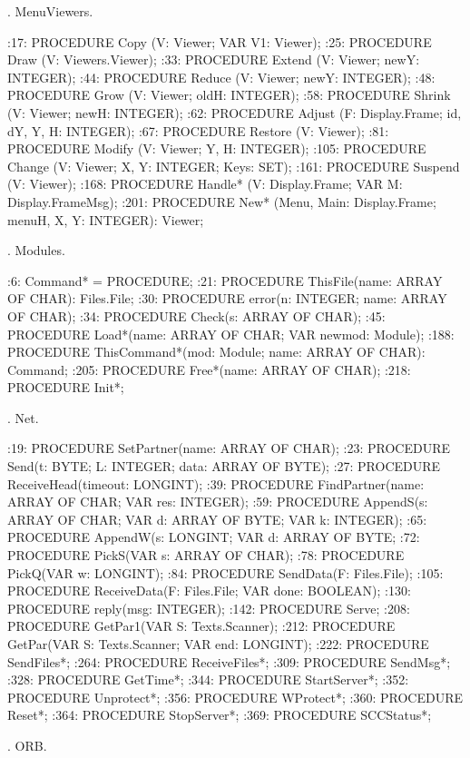 . MenuViewers.

:17:  PROCEDURE Copy (V: Viewer; VAR V1: Viewer);
:25:  PROCEDURE Draw (V: Viewers.Viewer);
:33:  PROCEDURE Extend (V: Viewer; newY: INTEGER);
:44:  PROCEDURE Reduce (V: Viewer; newY: INTEGER);
:48:  PROCEDURE Grow (V: Viewer; oldH: INTEGER);
:58:  PROCEDURE Shrink (V: Viewer; newH: INTEGER);
:62:  PROCEDURE Adjust (F: Display.Frame; id, dY, Y, H: INTEGER);
:67:  PROCEDURE Restore (V: Viewer);
:81:  PROCEDURE Modify (V: Viewer; Y, H: INTEGER);
:105:  PROCEDURE Change (V: Viewer; X, Y: INTEGER; Keys: SET);
:161:  PROCEDURE Suspend (V: Viewer);
:168:  PROCEDURE Handle* (V: Display.Frame; VAR M: Display.FrameMsg);
:201:  PROCEDURE New* (Menu, Main: Display.Frame; menuH, X, Y: INTEGER): Viewer; 

. Modules.

:6:    Command* = PROCEDURE;
:21:  PROCEDURE ThisFile(name: ARRAY OF CHAR): Files.File;
:30:  PROCEDURE error(n: INTEGER; name: ARRAY OF CHAR);
:34:  PROCEDURE Check(s: ARRAY OF CHAR);
:45:  PROCEDURE Load*(name: ARRAY OF CHAR; VAR newmod: Module);
:188:  PROCEDURE ThisCommand*(mod: Module; name: ARRAY OF CHAR): Command;
:205:  PROCEDURE Free*(name: ARRAY OF CHAR);
:218:  PROCEDURE Init*;

. Net.

:19:  PROCEDURE SetPartner(name: ARRAY OF CHAR);
:23:  PROCEDURE Send(t: BYTE; L: INTEGER; data: ARRAY OF BYTE);
:27:  PROCEDURE ReceiveHead(timeout: LONGINT);
:39:  PROCEDURE FindPartner(name: ARRAY OF CHAR; VAR res: INTEGER);
:59:  PROCEDURE AppendS(s: ARRAY OF CHAR; VAR d: ARRAY OF BYTE; VAR k: INTEGER);
:65:  PROCEDURE AppendW(s: LONGINT; VAR d: ARRAY OF BYTE;
:72:  PROCEDURE PickS(VAR s: ARRAY OF CHAR);
:78:  PROCEDURE PickQ(VAR w: LONGINT);
:84:  PROCEDURE SendData(F: Files.File);
:105:  PROCEDURE ReceiveData(F: Files.File; VAR done: BOOLEAN);
:130:  PROCEDURE reply(msg: INTEGER);
:142:  PROCEDURE Serve;
:208:  PROCEDURE GetPar1(VAR S: Texts.Scanner);
:212:  PROCEDURE GetPar(VAR S: Texts.Scanner; VAR end: LONGINT);
:222:  PROCEDURE SendFiles*;
:264:  PROCEDURE ReceiveFiles*;
:309:  PROCEDURE SendMsg*;
:328:  PROCEDURE GetTime*;
:344:  PROCEDURE StartServer*;
:352:  PROCEDURE Unprotect*;
:356:  PROCEDURE WProtect*;
:360:  PROCEDURE Reset*;
:364:  PROCEDURE StopServer*;
:369:  PROCEDURE SCCStatus*;

. ORB.

